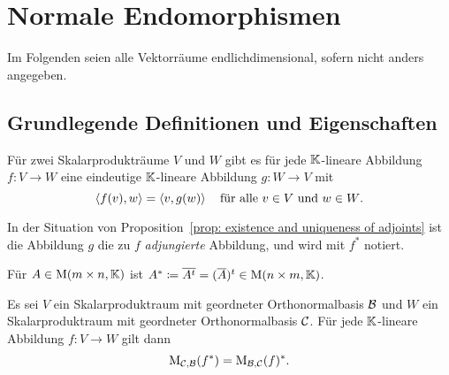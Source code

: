 \section{Normale Endomorphismen}


Im Folgenden seien alle Vektorräume endlichdimensional, sofern nicht anders angegeben.










\subsection{Grundlegende Definitionen und Eigenschaften}


\begin{proposition}\label{prop: existence and uniqueness of adjoints}
  Für zwei Skalarprodukträume $V$ und $W$ gibt es für jede $\mathbb{K}$-lineare Abbildung $f \colon V \to W$ eine eindeutige $\mathbb{K}$-lineare Abbildung $g \colon W \to V$ mit
  \[
    \left\langle f(v), w \right\rangle = \left\langle v, g(w) \right\rangle
    \quad
    \text{für alle $v \in V$ und $w \in W$}.
  \]
\end{proposition}


\begin{definition}
  In der Situation von Proposition~\ref{prop: existence and uniqueness of adjoints} ist die Abbildung $g$ die zu $f$ \emph{adjungierte} Abbildung, und wird mit $f^*$ notiert.
\end{definition}


\begin{definition}
  Für $A \in \mathrm{M}(m \times n, \mathbb{K})$ ist $A^* \coloneqq \overline{A^t} = (\overline{A})^t \in \mathrm{M}(n \times m, \mathbb{K})$.
\end{definition}


\begin{proposition}
  Es sei $V$ ein Skalarproduktraum mit geordneter Orthonormalbasis $\mathcal{B}$ und $W$ ein Skalarproduktraum mit geordneter Orthonormalbasis $\mathcal{C}$.
  Für jede $\mathbb{K}$-lineare Abbildung $f \colon V \to W$ gilt dann
  \[
    \mathrm{M}_{\mathcal{C}, \mathcal{B}}(f^*) = \mathrm{M}_{\mathcal{B}, \mathcal{C}}(f)^*.
  \]
\end{proposition}


